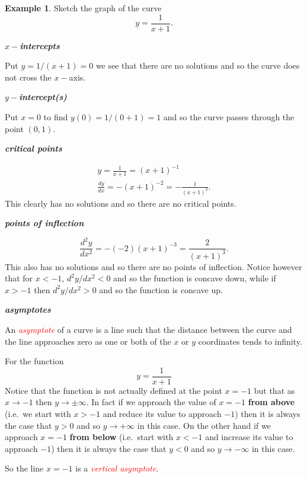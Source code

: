 \documentclass[
  11pt,
  oneside]{book}
\newcommand{\slide}{}
\theoremstyle{definition}
\theoremstyle{definition}
\newtheorem{example}{Example}[chapter]
\theoremstyle{definition}
\theoremstyle{definition}
\theoremstyle{remark}
\begin{document}
\begin{example}
Sketch the graph of the curve
\[
y = \frac1{x+1}.
\]
\end{example}

\textbf{\emph{\(x-\)intercepts}}

Put \(y=1/(x+1) = 0\) we see that there are no solutions and so the curve does not cross the \(x-\)axis.

\textbf{\emph{\(y-\)intercept(s)}}

Put \(x=0\) to find \(y(0) = 1/(0+1) = 1\) and so the curve passes through the point \((0,1)\).

\slide

\textbf{\emph{critical points}}

\begin{gather*}
y=\frac1{x+1} = (x+1)^{-1}\\
\frac{dy}{dx} = -(x+1)^{-2} = -\frac1{(x+1)^2}.
\end{gather*}
This clearly has no solutions and so there are no critical points.

\textbf{\emph{points of inflection}}

\[
\frac{d^2y}{dx^2} = -(-2)(x+1)^{-3} = \frac2{(x+1)^3}.
\]
This also has no solutions and so there are no points of inflection. Notice however that for \(x < -1\), \(d^2y/dx^2<0\) and so the function is concave down, while if \(x>-1\) then \(d^2y/dx^2 >0\) and so the function is concave up.

\slide

\textbf{\emph{asymptotes}}

An \textcolor{red}{\em asymptote} of a curve is a line such that the distance between the curve and the line approaches zero as one or both of the \(x\) or \(y\) coordinates tends to infinity.

For the function
\[
y=\frac1{x+1}
\]
Notice that the function is not actually defined at the point \(x=-1\) but that as \(x\to-1\) then \(y\to\pm\infty\). In fact if we approach the value of \(x=-1\) \textbf{from above} (i.e.~we start with \(x > -1\) and reduce its value to approach \(-1\)) then it is always the case that \(y>0\) and so \(y\to+\infty\) in this case. On the other hand if we approach \(x=-1\) \textbf{from below} (i.e.~start with \(x<-1\) and increase its value to approach \(-1\)) then it is always the case that \(y<0\) and so \(y\to-\infty\) in this case.

So the line \(x=-1\) is a \textcolor{red}{\em vertical asymptote}.
\end{document}
